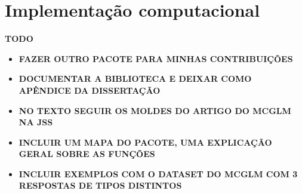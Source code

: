 \chapter{Implementação computacional}


\textbf{TODO}

\begin{itemize}

  \item \textbf{FAZER OUTRO PACOTE PARA MINHAS CONTRIBUIÇÕES}

  \item \textbf{DOCUMENTAR A BIBLIOTECA E DEIXAR COMO APÊNDICE DA DISSERTAÇÃO}

  \item \textbf{NO TEXTO SEGUIR OS MOLDES DO ARTIGO DO MCGLM NA JSS}

  \item \textbf{INCLUIR UM MAPA DO PACOTE, UMA EXPLICAÇÃO GERAL SOBRE AS FUNÇÕES}

  \item \textbf{INCLUIR EXEMPLOS COM O DATASET DO MCGLM COM 3 RESPOSTAS DE TIPOS DISTINTOS}

\end{itemize}





